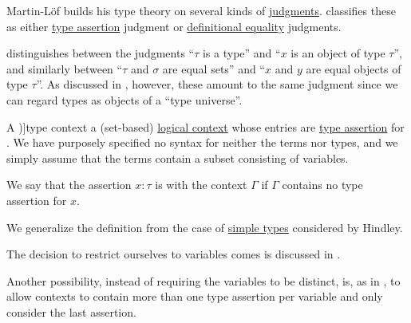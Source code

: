 \begin{remark}\label{rem:typing_judgments}
  Martin-L\"of builds his type theory on several kinds of \hyperref[con:judgment]{judgments}. \cite[19]{UnivalentProject2024OctoberHoTT} classifies these as either \hyperref[def:type_assertion]{type assertion} judgment or \hyperref[con:definitional_equality]{definitional equality} judgments.

   distinguishes between the judgments \enquote{\( \tau \) is a type} and \enquote{\( x \) is an object of type \( \tau \)}, and similarly between \enquote{\( \tau \) and \( \sigma \) are equal sets} and \enquote{\( x \) and \( y \) are equal objects of type \( \tau \)}. As discussed in , however, these amount to the same judgment since we can regard types as objects of a \enquote{type universe}.
\end{remark}

\begin{definition}\label{def:type_context}
  A \term[en=type-context (\cite[def. 2A5]{Hindley1997STT})]{type context} a (set-based) \hyperref[def:logical_context]{logical context} whose entries are \hyperref[def:type_assertion]{type assertion} for . We have purposely specified no syntax for neither the terms nor types, and we simply assume that the terms contain a subset consisting of variables.

  We say that the assertion \( x: \tau \) is  with the context \( \Gamma \) if \( \Gamma \) contains no type assertion for \( x \).
\end{definition}
\begin{comments}
  \item We generalize the definition from the case of \hyperref[def:simple_type]{simple types} considered by Hindley.

  \item The decision to restrict ourselves to variables comes is discussed in .

  \item Another possibility, instead of requiring the variables to be distinct, is, as in \cite[159]{Mimram2020Types}, to allow contexts to contain more than one type assertion per variable and only consider the last assertion.
\end{comments}

